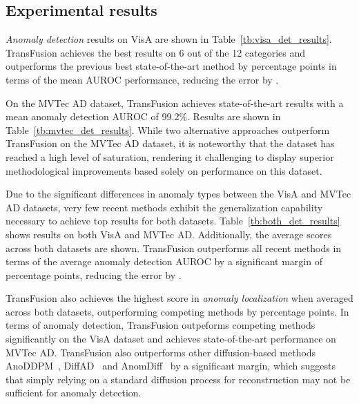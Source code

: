 \documentclass[10pt,twocolumn,letterpaper]{article}
\begin{document}
\subsection{Experimental results}




\textit{Anomaly detection} results on VisA are shown in Table~\ref{tb:visa_det_results}. TransFusion achieves the best results on 6 out of the 12 categories and outperforms the previous best state-of-the-art method by  percentage points in terms of the mean AUROC performance, reducing the error by .
 
On the MVTec AD dataset, TransFusion achieves state-of-the-art results with a mean anomaly detection AUROC of 99.2\%. Results are shown in Table~\ref{tb:mvtec_det_results}. While two alternative approaches outperform TransFusion on the MVTec AD dataset, it is noteworthy that the dataset has reached a high level of saturation, rendering it challenging to display superior methodological improvements based solely on performance on this dataset.

Due to the significant differences in anomaly types between the VisA and MVTec AD datasets, very few recent methods exhibit the generalization capability necessary to achieve top results for both datasets. Table~\ref{tb:both_det_results} shows results on both VisA and MVTec AD. Additionally, the average scores across both datasets are shown. TransFusion outperforms all recent methods in terms of the average anomaly detection AUROC by a significant margin of  percentage points, reducing the error by .

TransFusion also achieves the highest score in \textit{anomaly localization} when averaged across both datasets, outperforming competing methods by  percentage points. 
In terms of anomaly detection, TransFusion outpeforms competing methods significantly on the VisA dataset and achieves state-of-the-art performance on MVTec AD. TransFusion also outperforms other diffusion-based methods AnoDDPM~\cite{AnnoDDPM}, DiffAD~\cite{ldm_draem} and AnomDiff~\cite{ddpm-noise-anomaly} by a significant margin, which suggests that simply relying on a standard diffusion process for reconstruction may not be sufficient for anomaly detection. 
\end{document}
